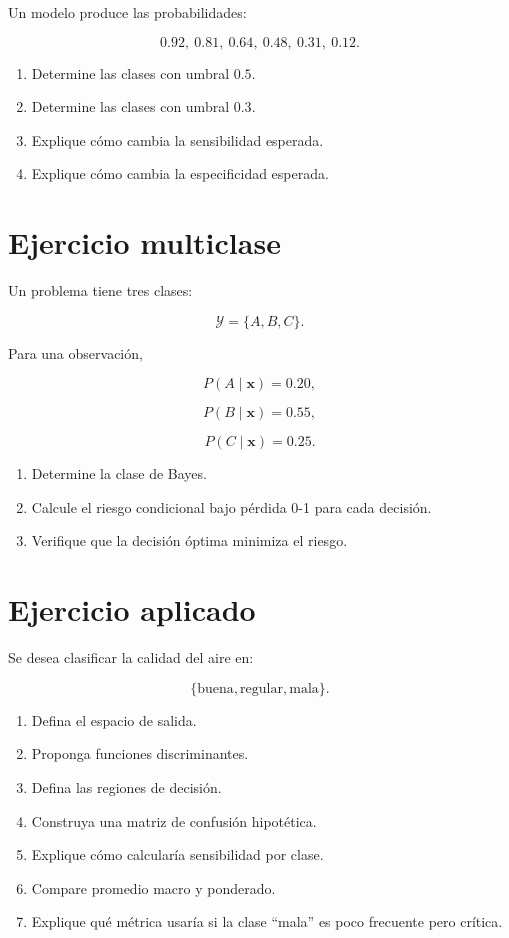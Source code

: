 \documentclass[
  spanish,
  11pt,
  letterpaper,
  DIV=11,
  numbers=noendperiod]{scrreprt}
\providecommand{\tightlist}{%
  \setlength{\itemsep}{0pt}\setlength{\parskip}{0pt}}
\theoremstyle{definition}
\theoremstyle{plain}
\theoremstyle{definition}
\theoremstyle{remark}
\begin{document}
Un modelo produce las probabilidades:

\[
0.92,\ 0.81,\ 0.64,\ 0.48,\ 0.31,\ 0.12.
\]

\begin{enumerate}
\def\labelenumi{\arabic{enumi}.}
\tightlist
\item
  Determine las clases con umbral \(0.5\).
\item
  Determine las clases con umbral \(0.3\).
\item
  Explique cómo cambia la sensibilidad esperada.
\item
  Explique cómo cambia la especificidad esperada.
\end{enumerate}

\section{Ejercicio multiclase}\label{ejercicio-multiclase}

Un problema tiene tres clases:

\[
\mathcal{Y}
=
\{A,B,C\}.
\]

Para una observación,

\[
P(A\mid\mathbf{x})=0.20,
\]

\[
P(B\mid\mathbf{x})=0.55,
\]

\[
P(C\mid\mathbf{x})=0.25.
\]

\begin{enumerate}
\def\labelenumi{\arabic{enumi}.}
\tightlist
\item
  Determine la clase de Bayes.
\item
  Calcule el riesgo condicional bajo pérdida 0-1 para cada decisión.
\item
  Verifique que la decisión óptima minimiza el riesgo.
\end{enumerate}

\section{Ejercicio aplicado}\label{ejercicio-aplicado-3}

Se desea clasificar la calidad del aire en:

\[
\{
\text{buena},
\text{regular},
\text{mala}
\}.
\]

\begin{enumerate}
\def\labelenumi{\arabic{enumi}.}
\tightlist
\item
  Defina el espacio de salida.
\item
  Proponga funciones discriminantes.
\item
  Defina las regiones de decisión.
\item
  Construya una matriz de confusión hipotética.
\item
  Explique cómo calcularía sensibilidad por clase.
\item
  Compare promedio macro y ponderado.
\item
  Explique qué métrica usaría si la clase ``mala'' es poco frecuente
  pero crítica.
\end{enumerate}
\end{document}

